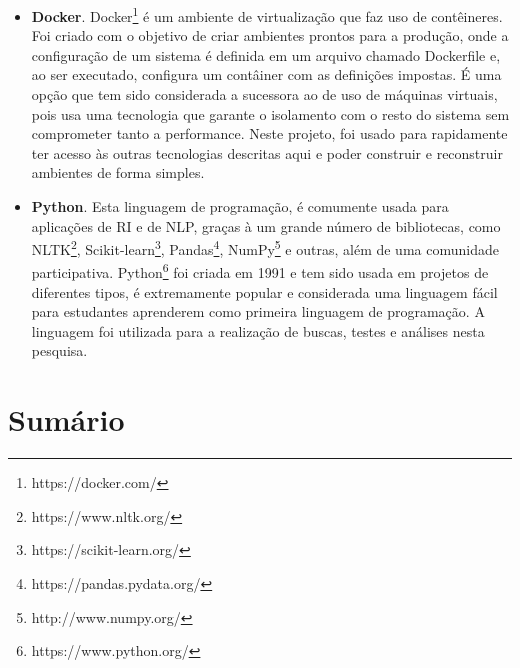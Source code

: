 \begin{itemize}
    \item \textbf{Docker}. Docker\footnote{https://docker.com/} é um ambiente de virtualização que faz uso de contêineres. Foi criado com o objetivo de criar ambientes prontos para a produção, onde a configuração de um sistema é definida em um arquivo chamado Dockerfile e, ao ser executado, configura um contâiner com as definições impostas. É uma opção que tem sido considerada a sucessora ao de uso de máquinas virtuais, pois usa uma tecnologia que garante o isolamento com o resto do sistema sem comprometer tanto a performance. Neste projeto, foi usado para rapidamente ter acesso às outras tecnologias descritas aqui e poder construir e reconstruir ambientes de forma simples.
    \item \textbf{Python}. Esta linguagem de programação, é comumente usada para aplicações de \ac{RI} e de \ac{NLP}, graças à um grande número de bibliotecas, como NLTK\footnote{https://www.nltk.org/}, Scikit-learn\footnote{https://scikit-learn.org/}, Pandas\footnote{https://pandas.pydata.org/}, NumPy\footnote{http://www.numpy.org/} e outras, além de uma comunidade participativa. Python\footnote{https://www.python.org/} foi criada em 1991 e tem sido usada em projetos de diferentes tipos, é extremamente popular e considerada uma linguagem fácil para estudantes aprenderem como primeira linguagem de programação. A linguagem foi utilizada para a realização de buscas, testes e análises nesta pesquisa.
\end{itemize}
\section{Sumário}
